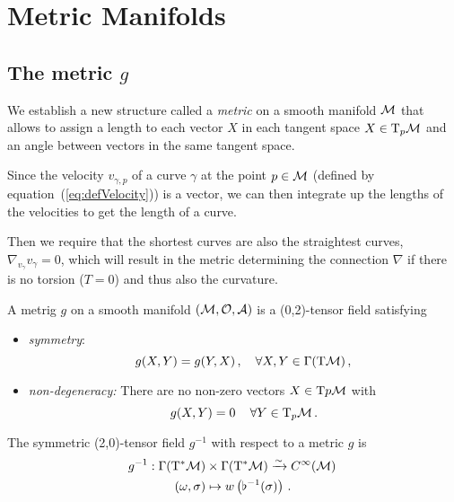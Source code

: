 \section{Metric Manifolds}
\subsection[The metric g]{The metric $g$}
We establish a new structure called a \textit{metric} on a smooth manifold $\mathcal{M}$
that allows to assign a length to each vector $X$ in each tangent space $X\in
\T_p\M$ and an angle between vectors in the same tangent space.

Since the velocity $v_{\gamma,p}$ of a curve $\gamma$ at the point $p\in\mathcal{M}$
(defined by equation~(\ref{eq:defVelocity})) is a vector, we can then integrate
up the lengths of the velocities to get the length of a curve.

Then we require that the shortest curves are also the straightest curves,
$\nabla_{v_\gamma} v_\gamma=0$, which will result in the metric determining
the connection $\nabla$ if there is no torsion ($T=0$) and thus also the
curvature.

\begin{defn}[Metric]
    A metrig $g$ on a smooth manifold $(\mathcal{M}, \mathcal{O}, \mathcal{A})$ is a
    (0,2)-tensor field satisfying
    \begin{itemize}
        \item \textit{symmetry}:
            \begin{equation}
                g(X,Y) = g(Y,X)\,,\quad\forall X,Y\in\Gamma(\T\M)\,,
            \end{equation}
        \item \textit{non-degeneracy:} There are no non-zero vectors $X\in\T{p}\M$
            with
            \begin{equation}
                g(X,Y) = 0\,\quad \forall Y\in\T_p\M\,.
            \end{equation}

    \end{itemize}
\end{defn}

\begin{defn}
    The symmetric (2,0)-tensor field $g^{-1}$ with respect to a metric $g$ is
    \begin{align}
        g^{-1}: \Gamma(\T^*\M) &\times\Gamma(\T^*\M) \linearto C^\infty(\M)\,\\
        (\omega, \sigma) &\mapsto w\left( \flat^{-1}(\sigma) \right)\,.
    \end{align}
\end{defn}

